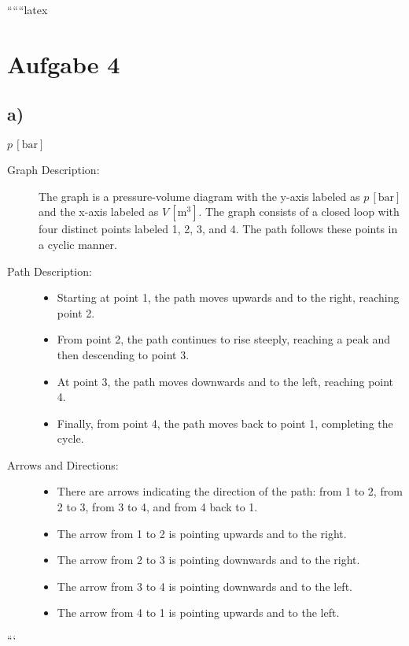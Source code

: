 
``````latex


\section*{Aufgabe 4}

\subsection*{a)}

$p \, [\text{bar}]$

\begin{description}
    \item[Graph Description:] The graph is a pressure-volume diagram with the y-axis labeled as \( p \, [\text{bar}] \) and the x-axis labeled as \( V \, [\text{m}^3] \). The graph consists of a closed loop with four distinct points labeled 1, 2, 3, and 4. The path follows these points in a cyclic manner.
    
    \item[Path Description:] 
    \begin{itemize}
        \item Starting at point 1, the path moves upwards and to the right, reaching point 2.
        \item From point 2, the path continues to rise steeply, reaching a peak and then descending to point 3.
        \item At point 3, the path moves downwards and to the left, reaching point 4.
        \item Finally, from point 4, the path moves back to point 1, completing the cycle.
    \end{itemize}
    
    \item[Arrows and Directions:] 
    \begin{itemize}
        \item There are arrows indicating the direction of the path: from 1 to 2, from 2 to 3, from 3 to 4, and from 4 back to 1.
        \item The arrow from 1 to 2 is pointing upwards and to the right.
        \item The arrow from 2 to 3 is pointing downwards and to the right.
        \item The arrow from 3 to 4 is pointing downwards and to the left.
        \item The arrow from 4 to 1 is pointing upwards and to the left.
    \end{itemize}
\end{description}

```